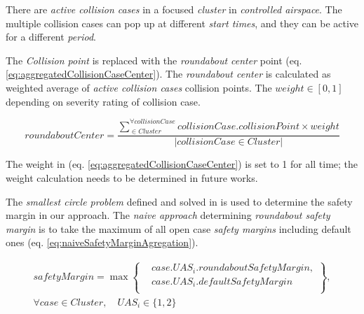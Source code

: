 There are \emph{active collision cases} in a focused \emph{cluster} in \emph{controlled airspace}. The multiple collision cases can pop up at different \emph{start times}, and they can be active for a different \emph{period}. 

The \emph{Collision point} is replaced with the \emph{roundabout center} point (eq. \ref{eq:aggregatedCollisionCaseCenter}). The \emph{roundabout center} is calculated as weighted average of \emph{active collision cases} collision points. The $weight \in [0,1]$ depending on severity rating of collision case.

\begin{equation}\label{eq:aggregatedCollisionCaseCenter}
    roundaboutCenter=\frac{\sum_{ \in Cluster}^{\forall collisionCase} collisionCase.collisionPoint \times weight}{\left | collisionCase \in Cluster \right |}
\end{equation}

\begin{note}
    The weight in (eq. \ref{eq:aggregatedCollisionCaseCenter}) is set to 1 for all time; the weight calculation needs to be determined in future works. 
\end{note}

The \emph{smallest circle problem} defined and solved in \cite{ritter1990efficient,welzl1991smallest} is used to determine the safety margin in our approach. The \emph{naive approach} determining \emph{roundabout safety margin} is to take the maximum of all open case \emph{safety margins} including default ones (eq. \ref{eq:naiveSafetyMarginAgregation}).

\begin{multline}\label{eq:naiveSafetyMarginAgregation}
    safetyMargin = \max \left\{\begin{aligned}&case.UAS_i.roundabout Safety Margin,\\&case.UAS_i.default Safety Margin\\\end{aligned}\right \},\\
    \forall case \in Cluster,\quad UAS_i \in \{1,2\}
\end{multline}



